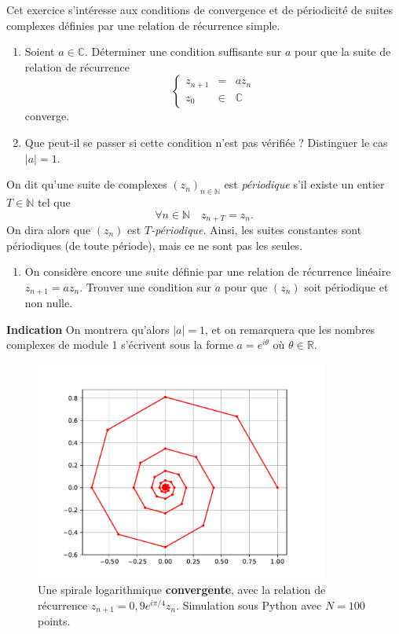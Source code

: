 \documentclass[12pt]{article}
\newcommand{\RR}{\mathbb R}
\newcommand{\CC}{\mathbb C}
\newcommand{\NN}{\mathbb N}
\theoremstyle{definition}
\begin{document}
\begin{exer}
Cet exercice s'intéresse aux conditions de convergence et de périodicité de suites complexes définies par une relation de récurrence simple.
\begin{enumerate}
	\item Soient $a\in\CC$. Déterminer une condition suffisante sur $a$ pour que la suite de relation de récurrence
	\[
	\left\{
	\begin{array}{rll}
	z_{n+1} &= &az_n\\
	z_0 &\in &\CC
	\end{array}
	\right.
	\]
	converge.
	\item Que peut-il se passer si cette condition n'est pas vérifiée ? Distinguer le cas $|a| = 1$.
\end{enumerate}
On dit qu'une suite de complexes $(z_n)_{n\in\NN}$ est \textit{périodique} s'il existe un entier $T\in\NN$ tel que
\[
\forall n\in\NN\quad z_{n+T} = z_n.
\]
On dira alors que $(z_n)$ est \textit{$T$-périodique}. Ainsi, les suites constantes sont périodiques (de toute période), mais ce ne sont pas les seules.
\begin{enumerate}[resume]
	\item On considère encore une suite définie par une relation de récurrence linéaire $z_{n+1} = az_n$. Trouver une condition sur $a$ pour que $(z_n)$ soit périodique et non nulle.
\end{enumerate}

\noindent\textbf{Indication} On montrera qu'alors $|a| = 1$, et on remarquera que les nombres complexes de module 1 s'écrivent sous la forme $a = e^{i\theta}$ où $\theta\in\RR$.
\end{exer}

\begin{figure}[H]
	\centering
	\includegraphics[width=0.86\textwidth]{resources/logaro.pdf}
	\caption{Une spirale logarithmique \textbf{convergente}, avec la relation de récurrence $z_{n+1} = 0,\!9e^{i\pi/4}z_n$. Simulation sous Python avec $N=100$ points.}
\end{figure}
\end{document}
